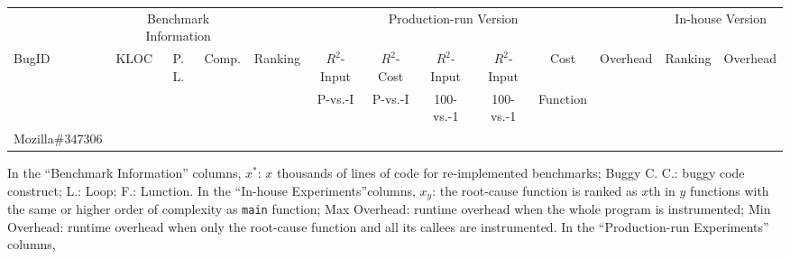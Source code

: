 \begin{table*}[h!]
  \centering
  \scriptsize
  {
  \newcommand{\Yes}[1]{\checkmark{}$_#1$}
  \newcommand{\No}[0]{-}
  {
  \begin{tabular}{lccc|ccccccc|cc}
    \toprule
        & \multicolumn{3}{c}{Benchmark Information} & \multicolumn{7}{c}{Production-run Version} & \multicolumn{2}{c}{In-house Version}   \\

    \cmidrule(lr){2-4}
    \cmidrule(lr){5-11}
    \cmidrule(lr){12-13}
    {BugID} & {KLOC} & {P. L.} & {Comp.} & {Ranking} & $R^2$-Input  & $R^2$-Cost & $R^2$-Input    & $R^2$-Input       & Cost     & {Overhead} & {Ranking} & {Overhead}  \\
                &            &             &             &               & \tiny{P-vs.-I} & \tiny{P-vs.-I} & \tiny{100-vs.-1} & \tiny{100-vs.-1}   & Function &            &  & \\
    \midrule
    Mozilla\#347306

    \bottomrule
   \end{tabular}
   }
   }
  \vspace{0.1in}
   {In the ``Benchmark Information'' columns,
   $x^*$: $x$ thousands of lines of code for re-implemented benchmarks;
   Buggy C. C.: buggy code construct;
   L.: Loop; 
   F.: Lunction.
   In the ``In-house Experiments''columns,
   $x_{y}$: the root-cause function is ranked as $x$th in $y$ 
   functions with the same or higher order of complexity as \texttt{main} function;
   Max Overhead: runtime overhead when the whole program is instrumented;
   Min Overhead: runtime overhead when only the root-cause function and all its callees are instrumented.
   In the ``Production-run Experiments'' columns, 
   }
\vspace{-0.15in}
\end{table*}
